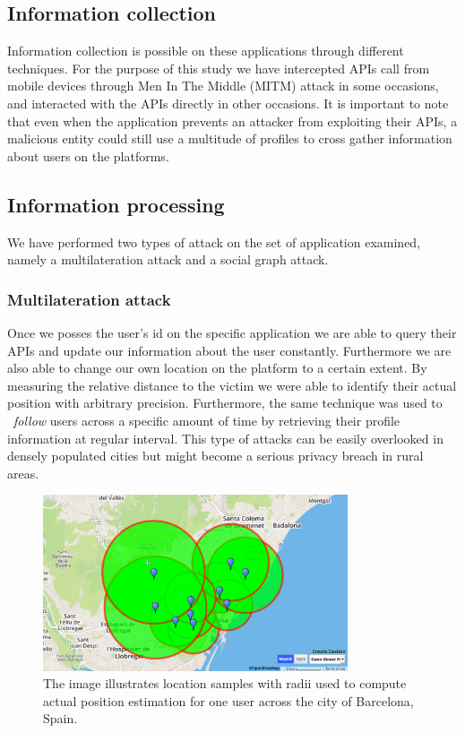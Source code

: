 \subsection{Information collection}
Information collection is possible on these applications through different techniques. For the purpose of this study we have intercepted APIs call from mobile devices through Men In The Middle (MITM) attack in some occasions, and interacted with the APIs directly in other occasions.
\noindent
It is important to note that even when the application prevents an attacker from exploiting their APIs, a malicious entity could still use a multitude of profiles to cross gather information about users on the platforms.

\subsection{Information processing}
We have performed two types of attack on the set of application examined, namely a multilateration attack and a social graph attack.

\subsubsection{Multilateration attack}
Once we posses the user's id on the specific application we are able to query their APIs and update our information about the user constantly. Furthermore we are also able to change our own location on the platform to a certain extent.
\noindent
By measuring the relative distance to the victim we were able to identify their actual position with arbitrary precision. Furthermore, the same technique was used to ~\emph{follow} users across a specific amount of time by retrieving their profile information at regular interval.
\noindent
This type of attacks can be easily overlooked in densely populated cities but might become a serious privacy breach in rural areas.

\begin{figure}[t]
\centering
\includegraphics[width=90mm]{figures/user_mlat.jpg}
\caption[Location samples for a single user.]{The image illustrates location samples with radii used to compute actual position estimation for one user across the city of Barcelona, Spain.
\label{fig:mlat}}
\end{figure}

